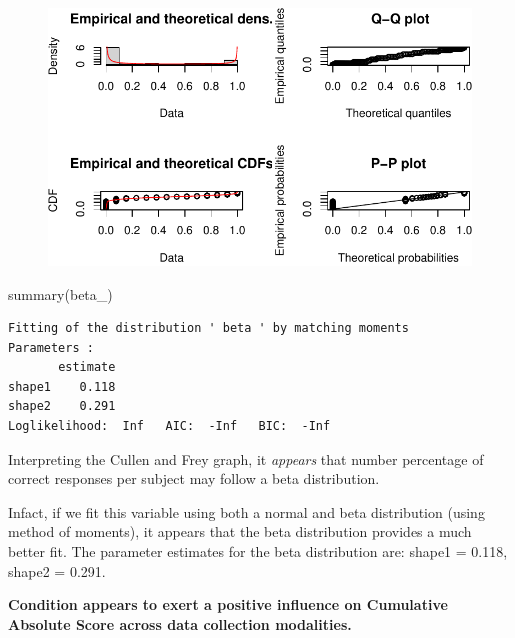 \documentclass[
  letterpaper,
  DIV=11,
  numbers=noendperiod]{scrreprt}
\newenvironment{Shaded}{\begin{snugshade}}{\end{snugshade}}
\newcommand{\FunctionTok}[1]{\textcolor[rgb]{0.28,0.35,0.67}{#1}}
\newcommand{\NormalTok}[1]{\textcolor[rgb]{0.00,0.23,0.31}{#1}}
\begin{document}
\begin{figure}[H]

{\centering \includegraphics{analysis/SGC3A/3_sgc3A_description_files/figure-pdf/FIT-DIST-TOTAL-ABS-3.pdf}

}

\end{figure}

\begin{Shaded}
\begin{Highlighting}[]
\FunctionTok{summary}\NormalTok{(beta\_)}
\end{Highlighting}
\end{Shaded}

\begin{verbatim}
Fitting of the distribution ' beta ' by matching moments 
Parameters : 
       estimate
shape1    0.118
shape2    0.291
Loglikelihood:  Inf   AIC:  -Inf   BIC:  -Inf 
\end{verbatim}

Interpreting the Cullen and Frey graph, it \emph{appears} that number
percentage of correct responses per subject may follow a beta
distribution.

Infact, if we fit this variable using both a normal and beta
distribution (using method of moments), it appears that the beta
distribution provides a much better fit. The parameter estimates for the
beta distribution are: shape1 = 0.118, shape2 = 0.291.

\begin{tcolorbox}[enhanced jigsaw, toptitle=1mm, toprule=.15mm, bottomtitle=1mm, leftrule=.75mm, title=\textcolor{quarto-callout-note-color}{\faInfo}\hspace{0.5em}{Note}, opacityback=0, titlerule=0mm, opacitybacktitle=0.6, colframe=quarto-callout-note-color-frame, rightrule=.15mm, breakable, bottomrule=.15mm, colbacktitle=quarto-callout-note-color!10!white, coltitle=black, arc=.35mm, colback=white, left=2mm]
\textbf{Condition appears to exert a positive influence on Cumulative
Absolute Score across data collection modalities.}
\end{tcolorbox}
\end{document}

